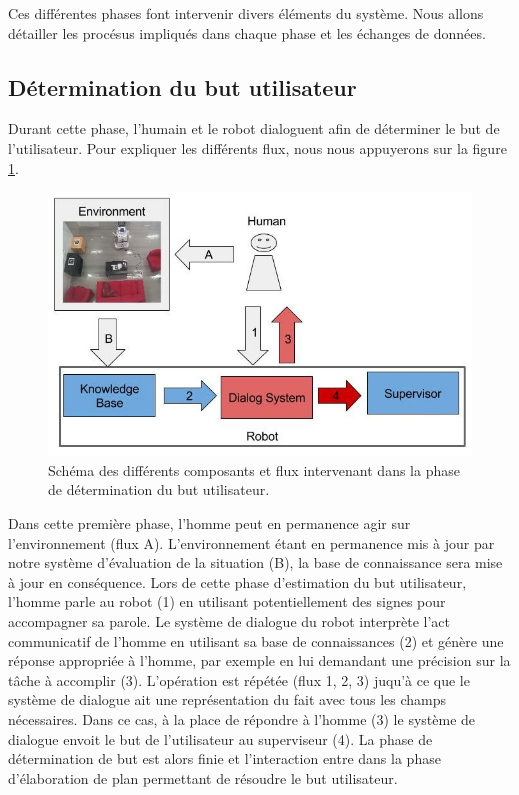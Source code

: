 \documentclass[a4paper,11pt,twoside]{StyleThese}
\begin{document}
Ces différentes phases font intervenir divers éléments du système.
Nous allons détailler les procésus impliqués dans chaque phase et les échanges de données.

\subsection{Détermination du but utilisateur}
\label{sec:phase1}
Durant cette phase, l'humain et le robot dialoguent afin de déterminer le but de l'utilisateur. Pour expliquer les différents flux, nous nous appuyerons sur la figure \ref{fig:phase1}.


\begin{figure}[ht!]
 \centering
  \includegraphics[width=0.99\linewidth]{./img/phase1color.jpg} 
  \caption {Schéma des différents composants et flux intervenant dans la phase de détermination du but utilisateur.}
  \label{fig:phase1}
\end{figure}

Dans cette première phase, l'homme peut en permanence agir sur l'environnement (flux A). L'environnement étant en permanence mis à jour par notre système d'évaluation de la situation (B), la base de connaissance sera mise à jour en conséquence.
Lors de cette phase d'estimation du but utilisateur, l'homme parle au robot (1) en utilisant potentiellement des signes pour accompagner sa parole. Le système de dialogue du robot interprète l'act communicatif de l'homme en utilisant sa base de connaissances (2) et génère une réponse appropriée à l'homme, par exemple en lui demandant une précision sur la tâche à accomplir (3). L'opération est répétée (flux 1, 2, 3) juqu'à ce que le système de dialogue ait une représentation du fait avec tous les champs nécessaires. Dans ce cas, à la place de répondre à l'homme (3) le système de dialogue envoit le but de l'utilisateur au superviseur (4). La phase de détermination de but est alors finie et l'interaction entre dans la phase d'élaboration de plan permettant de résoudre le but utilisateur. 
\end{document}
